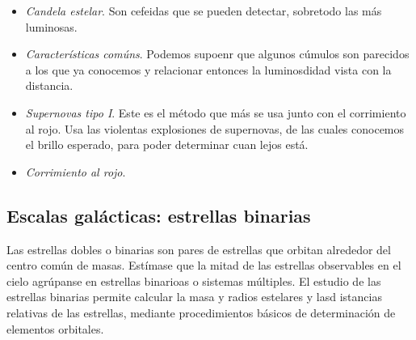 \begin{itemize}
	\item \textit{Candela estelar}. Son cefeidas que se pueden detectar, sobretodo las más luminosas.
	\item \textit{Características comúns}. Podemos supoenr que algunos cúmulos son parecidos a los que ya conocemos y relacionar entonces la luminosdidad vista con la distancia.
	\item \textit{Supernovas tipo I}. Este es el método que más se usa junto con el corrimiento al rojo. Usa las violentas explosiones de supernovas, de las cuales conocemos el brillo esperado, para poder determinar cuan lejos está.
	\item \textit{Corrimiento al rojo}.
\end{itemize}


\subsection{Escalas galácticas: estrellas binarias}

Las estrellas dobles o binarias son pares de estrellas que orbitan alrededor del centro común de masas. Estímase que la mitad de las estrellas observables en el cielo agrúpanse en estrellas binarioas o sistemas múltiples. El estudio de las estrellas binarias permite calcular la masa y radios estelares y lasd istancias relativas de las estrellas, mediante procedimientos básicos de determinación de elementos orbitales.

